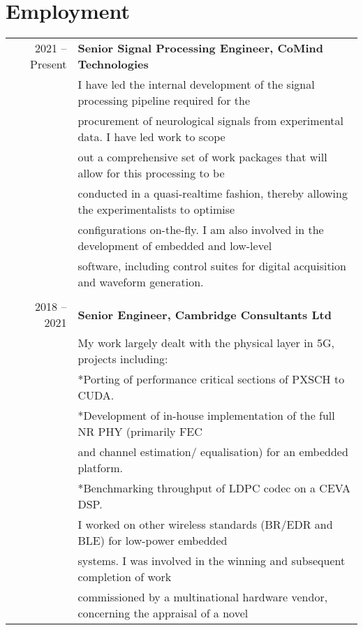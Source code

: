 \documentclass[11pt]{article} %
\begin{document}
\section{Employment}
\begin{tabular}{rl}
2021 -- Present & \textbf{Senior Signal Processing Engineer, CoMind Technologies}\\
&I have led the internal development of the signal processing pipeline required for the\\
&procurement of neurological signals from experimental data. I have led work to scope\\
&out a comprehensive set of work packages that will allow for this processing to be\\
&conducted in a quasi-realtime fashion, thereby allowing the experimentalists to optimise\\
&configurations on-the-fly. I am also involved in the development of embedded and low-level\\
&software, including control suites for digital acquisition and waveform generation.\\
&\\
2018 -- 2021 & \textbf{Senior Engineer, Cambridge Consultants Ltd}\\
&My work largely dealt with the physical layer in 5G, projects including:\\
&\hspace{5mm}*\hspace{3mm}Porting of performance critical sections of PXSCH to CUDA.\\
&\hspace{5mm}*\hspace{3mm}Development of in-house implementation of the full NR PHY (primarily FEC\\
&\hspace{5mm}\hphantom{*}\hspace{3mm}and channel estimation/ equalisation) for an embedded platform.\\
&\hspace{5mm}*\hspace{3mm}Benchmarking throughput of LDPC codec on a CEVA DSP.\\
&I worked on other wireless standards (BR/EDR and BLE) for low-power embedded\\ 
&systems. I was involved in the winning and subsequent completion of work\\ 
&commissioned by a multinational hardware vendor, concerning the appraisal of a novel\\ 

\end{tabular}
\end{document}
